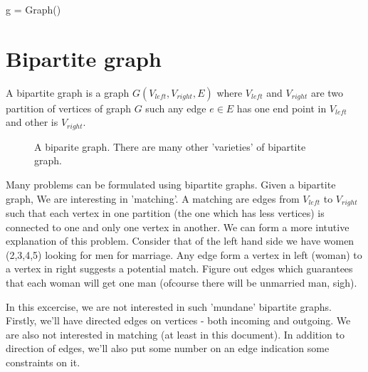 \documentclass[10pt,a4paper]{article}%
\begin{document}
\nwenddocs{}\endmoddef\nwstartdeflinemarkup\nwenddeflinemarkup
g = Graph()

\nwendcode{}\section{Bipartite graph}

A bipartite graph is a graph $G(V_{left}, V_{right}, E)$ where $V_{left}$ and
$V_{right}$ are two partition of vertices of graph $G$ such any edge $e \in E$
has one end point in $V_{left}$ and other is $V_{right}$. 


\begin{figure}[h]
\centering
{}
\caption{A biparite graph. There are many other 'varieties' of bipartite graph.}
\label{fig:generic_bipartite_graph}
\end{figure}

Many problems can be formulated using bipartite graphs. Given a bipartite graph,
We are interesting in 'matching'. A matching are edges from $V_{left}$ to
$V_{right}$ such that each vertex in one partition (the one which has less
vertices) is connected to one and only one vertex in another. We can form a
more intutive explanation of this problem.  Consider that of the left hand side
we have women (2,3,4,5) looking for men for marriage. Any edge form a vertex in
left (woman) to a vertex in right suggests a potential match. Figure out edges
which guarantees that each woman will get one man (ofcourse there will be
unmarried man, sigh).

In this excercise, we are not interested in such 'mundane' bipartite graphs.
Firstly, we'll have directed edges on vertices - both incoming and outgoing. We
are also not interested in matching (at least in this document). In addition to
direction of edges, we'll also put some number on an edge indication some
constraints on it. 
\end{document}
